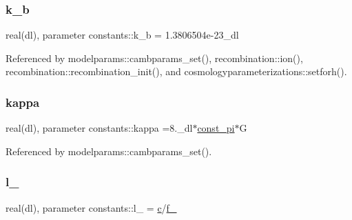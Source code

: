 \mbox{\label{namespaceconstants_a5beb5fedefa5380e9fb06e6bd8a16d43}} 
\subsubsection{\texorpdfstring{k\+\_\+b}{k\_b}}
{\footnotesize\ttfamily real(dl), parameter constants\+::k\+\_\+b = 1.\+3806504e-\/23\+\_\+dl}



Referenced by modelparams\+::cambparams\+\_\+set(), recombination\+::ion(), recombination\+::recombination\+\_\+init(), and cosmologyparameterizations\+::setforh().

\mbox{\label{namespaceconstants_a1c51ffffcc61d146e0a27d8340cba5c3}} 
\subsubsection{\texorpdfstring{kappa}{kappa}}
{\footnotesize\ttfamily real(dl), parameter constants\+::kappa =8.\+\_\+dl$\ast$\mbox{\hyperlink{namespaceconstants_ae6b5af15d3fb28a3dba468486c548447}{const\+\_\+pi}}$\ast$G}



Referenced by modelparams\+::cambparams\+\_\+set().

\mbox{\label{namespaceconstants_af1bb81b6c283a010f3e86c321579edb0}} 
\subsubsection{\texorpdfstring{l\+\_\+21cm}{l\_21cm}}
{\footnotesize\ttfamily real(dl), parameter constants\+::l\+\_\+21cm = \mbox{\hyperlink{namespaceconstants_acf9c352e48b37fa8a9aff3e5957246b8}{c}}/\mbox{\hyperlink{namespaceconstants_aacc448f4915bb510b8d82376e8bd6963}{f\+\_\+21cm}}}

\mbox{\label{namespaceconstants_a88e7bcc44bb448025989fb1553167d45}} 
